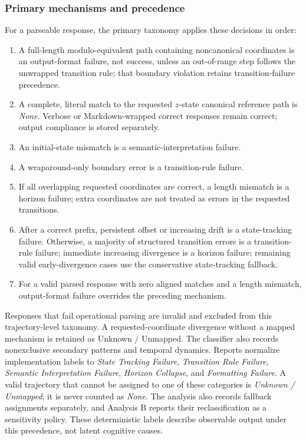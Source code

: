 \documentclass{article}
\begin{document}
\subsubsection{Primary mechanisms and precedence}
    For a parseable response, the primary taxonomy applies these decisions in
    order:
\begin{enumerate}
        \item A full-length modulo-equivalent path containing noncanonical
        coordinates is an output-format failure, not success, unless an
        out-of-range step follows the unwrapped transition rule; that boundary
        violation retains transition-failure precedence.
        \item A complete, literal match to the requested $z$-state canonical reference path is
        \emph{None}. Verbose or Markdown-wrapped correct responses remain correct;
        output compliance is stored separately.
    \item An initial-state mismatch is a semantic-interpretation failure.
    \item A wraparound-only boundary error is a transition-rule failure.
        \item If all overlapping requested coordinates are correct, a length
        mismatch is a horizon failure; extra coordinates are not treated as
        errors in the requested transitions.
    \item After a correct prefix, persistent offset or increasing drift is a
    state-tracking failure. Otherwise, a majority of structured transition
    errors is a transition-rule failure; immediate increasing divergence is a
    horizon failure; remaining valid early-divergence cases use the
    conservative state-tracking fallback.
        \item For a valid parsed response with zero aligned matches and a length
        mismatch, output-format failure overrides the preceding mechanism.
\end{enumerate}
    Responses that fail operational parsing are invalid and excluded from this
    trajectory-level taxonomy. A requested-coordinate divergence without a
    mapped mechanism is retained as Unknown / Unmapped.
The classifier also records nonexclusive secondary patterns and temporal
dynamics. Reports normalize implementation labels to \emph{State Tracking
Failure}, \emph{Transition Rule Failure}, \emph{Semantic Interpretation
Failure}, \emph{Horizon Collapse}, and \emph{Formatting Failure}. A valid
trajectory that cannot be assigned to one of these categories is
\emph{Unknown / Unmapped}; it is never counted as \emph{None}. The analysis
also records fallback assignments separately, and Analysis B reports their
reclassification as a sensitivity policy. These deterministic labels describe
observable output under this precedence, not latent cognitive causes.
\end{document}
